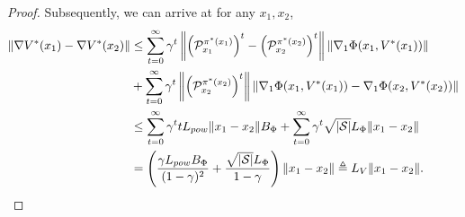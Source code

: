 \documentclass{article}
\theoremstyle{plain}
\theoremstyle{definition}
\theoremstyle{remark}
\def\cP{\mathcal P}
\def\cS{\mathcal S}
\def\bydef{\triangleq}
\begin{document}
\begin{proof}
    Subsequently, we can arrive at for any $x_1,x_2$,
    \begin{align} 
        \| \nabla V^*(x_1) - \nabla V^*(x_2) \| & \leq \sum_{t=0}^\infty \gamma^t \left\|    \left(\cP^{\pi^*(x_1)}_{x_1}\right)^t  -  \left(\cP^{\pi^*(x_2)}_{x_2}\right)^t  \right\| \left\|\nabla_1 \Phi(x_1,V^*(x_1))\right\| \notag \\
        & +  \sum_{t=0}^\infty \gamma^t\left\|  \left(\cP^{\pi^*(x_2)}_{x_2}\right)^t  \right\| \left\|  \nabla_1 \Phi(x_1,V^*(x_1)) -   \nabla_1 \Phi(x_2,V^*(x_2))\right\|  \notag\\
        & \leq \sum_{t=0}^\infty \gamma^t t L_{pow} \| x_1 - x_2 \| B_\Phi + \sum_{t=0}^\infty \gamma^t \sqrt{|\cS|}L_\Phi \| x_1 - x_2 \| \notag\\
        & = \left( \frac{\gamma L_{pow} B_\Phi}{(1-\gamma)^2} + \frac{\sqrt{|\cS|} L_\Phi}{1-\gamma} \right) \| x_1 - x_2 \| \bydef L_V \| x_1 - x_2 \| .
    \end{align}


\end{proof}
\end{document}
